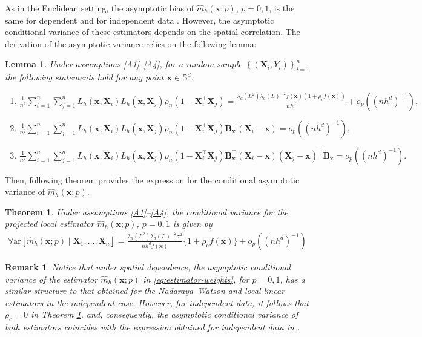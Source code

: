 \documentclass[12pt]{report} %
\newtheorem{theorem}{Theorem}
\newtheorem{lemma}{Lemma}
\newtheorem{remark}{Remark}
\newcommand{\bX}{\mathbf{X}}
\newcommand{\bx}{\mathbf{x}}
\newcommand{\Sd}{\mathbb{S}^{d}}
\newcommand{\bB}{\mathbf{B}}
\newcommand{\lc}{\left[}
\newcommand{\rc}{\right]}
\newcommand{\lrp}[1]{\left(#1\right)}
\newcommand{\V}[1]{\mathbb{V}\mathrm{ar}\lc #1\rc}
\begin{document}
As in the Euclidean setting, the asymptotic bias of $\hat{m}_{h}(\bx;p)$, $p=0,1$, is the same for dependent and for independent data \citep[][Theorem 7.1]{Garcia-Portugues2014a}. However, the asymptotic conditional variance of these estimators depends on the spatial correlation. The derivation of the asymptotic variance relies on the following lemma:

\begin{lemma}\label{lem:sums} Under assumptions \ref{A1}--\ref{A4}, for a random sample $\left\{\left(\bX_i, Y_i\right)\right\}_{i=1}^n$ the following statements hold for any point $\bx \in \Sd$:
\begin{enumerate}[label=\roman*)]
    \item \label{lem:sums1} $\frac{1}{n^2} \sum_{i=1}^n \sum_{j=1}^nL_h\left(\bx, \bX_i\right) L_h\left(\bx, \bX_j\right) \rho_n\left(1-\bX_i^\top\bX_j\right)= \frac{\lambda_d(L^2)\lambda_d(L)^{-2}f(\bx)
\left(1 + \rho_c f(\bx)\right)}{nh^d}
+ o_p\!\left((nh^d)^{-1}\right),$
    \item \label{lem:sums2} $\frac{1}{n^2} \sum_{i=1}^n \sum_{j=1}^nL_h\left(\bx, \bX_i\right) L_h\left(\bx, \bX_j\right) \rho_n\left(1-\bX_i^\top\bX_j\right)\bB_{\bx}^\top\left(\bX_i-\bx\right)= o_p\!\left((nh^d)^{-1}\right),$
    \item \label{lem:sums3} $\frac{1}{n^2} \sum_{i=1}^n \sum_{j=1}^nL_h\left(\bx, \bX_i\right) L_h\left(\bx, \bX_j\right) \rho_n\left(1-\bX_i^\top\bX_j\right)\bB_{\bx}^\top\left(\bX_i-\bx\right)\left(\bX_j-\bx\right)^\top\bB_{\bx}= o_p\!\left((nh^d)^{-1}\right).$
\end{enumerate}
\end{lemma}

Then, following theorem provides the expression for the conditional asymptotic variance of $\hat{m}_{h}(\bx;p)$.

\begin{theorem}\label{th:var}
Under assumptions \ref{A1}--\ref{A4}, the conditional variance for the projected local estimator $\hat{m}_{h}(\bx;p)$, $p=0,1$ is given by
\begin{align}
\V{\hat{m}_{h}(\bx;p) \mid \bX_1, \ldots, \bX_n}=\frac{\lambda_d\left(L^2\right) \lambda_d(L)^{-2}\sigma^2}{n h^d f(\bx)}\{1+\rho_{\mathrm{c}} f(\bx)\} +o_p\lrp{\lrp{n h^d}^{-1}}
\end {align}
\end{theorem}

\begin{remark}
Notice that under spatial dependence, the 
asymptotic conditional variance of the estimator $\hat{m}_{h}(\bx;p)$ in \eqref{eq:estimator-weights}, for $p=0,1$, has a similar structure to that obtained for the Nadaraya--Watson and local linear estimators in the independent case. However, for independent data, it follows that $\rho_{\mathrm{c}}=0$ in Theorem \ref{th:var}, and, consequently, the asymptotic conditional variance of both estimators coincides with the expression obtained for independent data in \citet{Garcia-Portugues2016}.
\end{remark}
\end{document}
